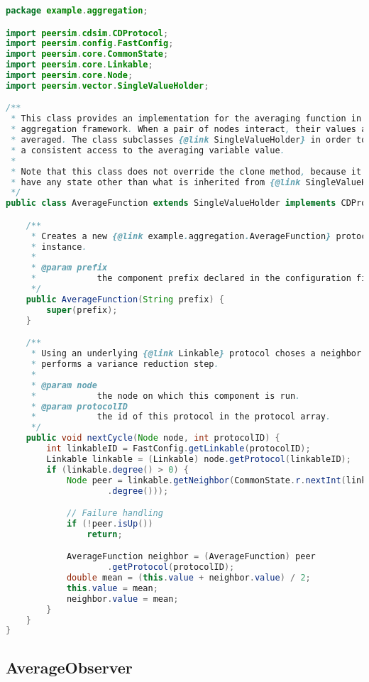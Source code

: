 \begin{lstlisting}[language=java, basicstyle=\footnotesize]
package example.aggregation;

import peersim.cdsim.CDProtocol;
import peersim.config.FastConfig;
import peersim.core.CommonState;
import peersim.core.Linkable;
import peersim.core.Node;
import peersim.vector.SingleValueHolder;

/**
 * This class provides an implementation for the averaging function in the
 * aggregation framework. When a pair of nodes interact, their values are
 * averaged. The class subclasses {@link SingleValueHolder} in order to provide
 * a consistent access to the averaging variable value.
 * 
 * Note that this class does not override the clone method, because it does not
 * have any state other than what is inherited from {@link SingleValueHolder}.
 */
public class AverageFunction extends SingleValueHolder implements CDProtocol {

    /**
     * Creates a new {@link example.aggregation.AverageFunction} protocol
     * instance.
     * 
     * @param prefix
     *            the component prefix declared in the configuration file.
     */
    public AverageFunction(String prefix) {
        super(prefix);
    }

    /**
     * Using an underlying {@link Linkable} protocol choses a neighbor and
     * performs a variance reduction step.
     * 
     * @param node
     *            the node on which this component is run.
     * @param protocolID
     *            the id of this protocol in the protocol array.
     */
    public void nextCycle(Node node, int protocolID) {
        int linkableID = FastConfig.getLinkable(protocolID);
        Linkable linkable = (Linkable) node.getProtocol(linkableID);
        if (linkable.degree() > 0) {
            Node peer = linkable.getNeighbor(CommonState.r.nextInt(linkable
                    .degree()));

            // Failure handling
            if (!peer.isUp())
                return;

            AverageFunction neighbor = (AverageFunction) peer
                    .getProtocol(protocolID);
            double mean = (this.value + neighbor.value) / 2;
            this.value = mean;
            neighbor.value = mean;
        }
    }
}
\end{lstlisting}

\subsection{AverageObserver}

